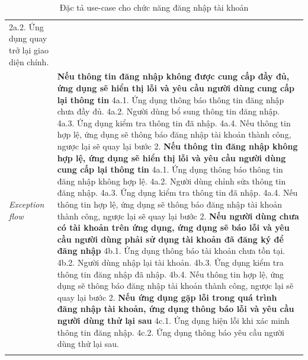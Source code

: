\begin{center}
\begin{longtable}{
        |>{\raggedright\arraybackslash}p{3cm}
        |>{\raggedright\arraybackslash}p{13cm}
        |}
        2a.2. Ứng dụng quay trở lại giao diện chính.
        \\\hdashline
        \rowcolor{cyan!10!white} \textit{Exception flow} & 
        \textbf{Nếu thông tin đăng nhập không được cung cấp đầy đủ, ứng dụng sẽ hiển thị lỗi và yêu cầu người dùng cung cấp lại thông tin} \newline
        4a.1. Ứng dụng thông báo thông tin đăng nhập chưa đầy đủ. \newline
        4a.2. Người dùng bổ sung thông tin đăng nhập. \newline
        4a.3. Ứng dụng kiểm tra thông tin đã nhập. \newline
        4a.4. Nếu thông tin hợp lệ, ứng dụng sẽ thông báo đăng nhập tài khoản thành công, ngược lại sẽ quay lại bước 2. \newline
        \textbf{Nếu thông tin đăng nhập không hợp lệ, ứng dụng sẽ hiển thị lỗi và yêu cầu người dùng cung cấp lại thông tin} \newline
        4a.1. Ứng dụng thông báo thông tin đăng nhập không hợp lệ. \newline
        4a.2. Người dùng chỉnh sửa thông tin đăng nhập. \newline
        4a.3. Ứng dụng kiểm tra thông tin đã nhập. \newline
        4a.4. Nếu thông tin hợp lệ, ứng dụng sẽ thông báo đăng nhập tài khoản thành công, ngược lại sẽ quay lại bước 2. \newline
        \textbf{Nếu người dùng chưa có tài khoản trên ứng dụng, ứng dụng sẽ báo lỗi và yêu cầu người dùng phải sử dụng tài khoản đã đăng ký để đăng nhập} \newline
        4b.1. Ứng dụng thông báo tài khoản chưa tồn tại. \newline
        4b.2. Người dùng nhập lại tài khoản. \newline
        4b.3. Ứng dụng kiểm tra thông tin đăng nhập đã nhập. \newline
        4b.4. Nếu thông tin hợp lệ, ứng dụng sẽ thông báo đăng nhập tài khoản thành công, ngược lại sẽ quay lại bước 2. \newline
        \textbf{Nếu ứng dụng gặp lỗi trong quá trình đăng nhập tài khoản, ứng dụng thông báo lỗi và yêu cầu người dùng thử lại sau} \newline
        4c.1. Ứng dụng hiện lỗi khi xác minh thông tin đăng nhập. \newline
        4c.2. Ứng dụng thông báo yêu cầu người dùng thử lại sau.
        \\\hline
        \caption{Đặc tả use-case cho chức năng đăng nhập tài khoản}
    \end{longtable}
\end{center}
